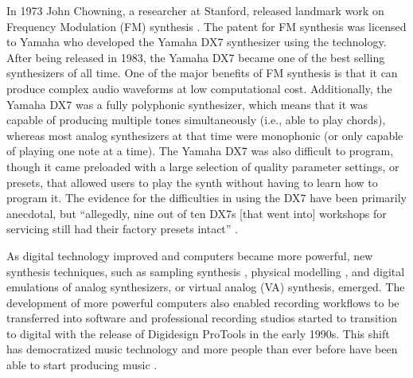 In 1973 John Chowning, a researcher at Stanford, released landmark work on Frequency Modulation (FM) synthesis \cite{chowning1973synthesis}. The patent for FM synthesis was licensed to Yamaha who developed the Yamaha DX7 synthesizer using the technology. After being released in 1983, the Yamaha DX7 became one of the best selling synthesizers of all time. One of the major benefits of FM synthesis is that it can produce complex audio waveforms at low computational cost. Additionally, the Yamaha DX7 was a fully polyphonic synthesizer, which means that it was capable of producing multiple tones simultaneously (i.e., able to play chords), whereas most analog synthesizers at that time were monophonic (or only capable of playing one note at a time). The Yamaha DX7 was also difficult to program, though it came preloaded with a large selection of quality parameter settings, or presets, that allowed users to play the synth without having to learn how to program it. The evidence for the difficulties in using the DX7 have been primarily anecdotal, but ``allegedly, nine out of ten DX7s [that went into] workshops for servicing still had their factory presets intact” \cite{seago2004critical}.

As digital technology improved and computers became more powerful, new synthesis techniques, such as sampling synthesis \cite{mcguire2015musical}, physical modelling \cite{jaffe1983extensions}, and digital emulations of analog synthesizers, or virtual analog (VA) synthesis, emerged. The development of more powerful computers also enabled recording workflows to be transferred into software and professional recording studios started to transition to digital with the release of Digidesign ProTools in the early 1990s. This shift has democratized music technology and more people than ever before have been able to start producing music \cite{tavana2015democracy}.


